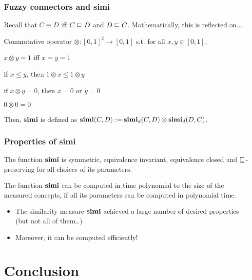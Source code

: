 \documentclass[smaller]{beamer}
\begin{document}
\begin{frame}
  \frametitle{Fuzzy connectors and simi}
  Recall that \(C \equiv D\) iff \(C \sqsubseteq_{\mathcal{}} D\)
  and \(D \sqsubseteq_{\mathcal{}} C\).
  Mathematically, this is reflected on...
  \begin{definition}
    Commutative operator
    \(\otimes \colon%
    {[0,1]}^2 \to [0,1]\) s.t. for all
    \(x, y \in [0,1]\),
    \begin{description}[<+->]
      \item[Equivalence closed]\label{fu:1}
      \(x \otimes y = 1\) iff \(x = y = 1\)
      \item[Weak monotonic]\label{fu:2}
      if \(x \le y\), then
      \(1 \otimes x \le 1 \otimes y\) 
      \item[Bounded]\label{fu:3}
      if \(x \otimes y = 0\), then
      \(x = 0\) or \(y = 0\)
      \item[Grounded]\label{fu:4}
      \(0 \otimes 0 = 0\)
    \end{description}
  \end{definition}
  Then, \(\operatorname{\mathbf{simi}}\) is defined as
\(\operatorname{\mathbf{simi}}(C,D) := \operatorname{\mathbf{simi}}_d(C,D) \otimes \operatorname{\mathbf{simi}}_d(D,C)\).
\end{frame}

\begin{frame}
  \frametitle{Properties of simi}
  \begin{theorem}
    The function \(\operatorname{\mathbf{simi}}\) is
    symmetric,
    equivalence invariant,
    equivalence closed and
    \(\sqsubseteq_{\mathcal{}}\)-preserving
    for all choices of its parameters.
  \end{theorem}
  \begin{theorem}
    The function \(\operatorname{\mathbf{simi}}\) can be computed in time
    polynomial to the size of the measured concepts,
    if all its parameters can be computed in polynomial time.
  \end{theorem}
  \begin{itemize}
    \item The similarity measure \(\operatorname{\mathbf{simi}}\)
    achieved a large number of desired properties
    (but not all of them\ldots)
    \item Moreover, it can be computed efficiently!
  \end{itemize}
\end{frame}

\section{Conclusion}
\end{document}
